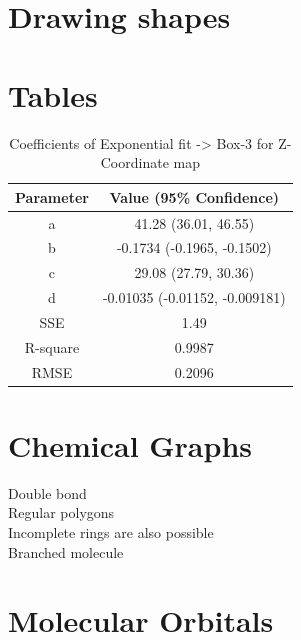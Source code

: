 \documentclass{memoir}
\begin{document}
\section{Drawing shapes}

\section{Tables}

\begin{table}[H]
	\centering
	\caption{Coefficients of Exponential fit -> Box-3 for Z-Coordinate map}
	\begin{tabular}{cc}
		\hline 
		Parameter & Value (95\% Confidence) \\ 
		\hline 
		a & 41.28 (36.01, 46.55) \\  
		b & -0.1734 (-0.1965, -0.1502) \\ 
		c & 29.08 (27.79, 30.36) \\  
		d & -0.01035 (-0.01152, -0.009181) \\  
		SSE & 1.49 \\ 
		R-square & 0.9987 \\  
		RMSE & 0.2096 \\ 
		\hline 
	\end{tabular}
	\label{tab:box3-coeff}
\end{table}

\section{Chemical Graphs}
Double bond
\\
Regular polygons
\\
Incomplete rings are also possible
\\
Branched molecule \vspace{.5cm}


\section{Molecular Orbitals}
\begin{modiagram}
\end{modiagram}
\end{document}
